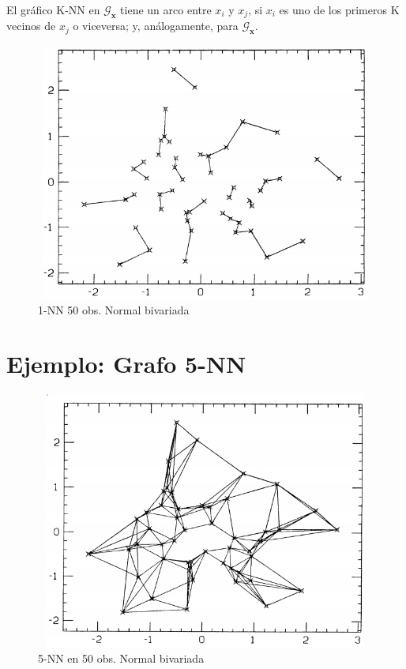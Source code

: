 \documentclass[]{book}
\begin{document}
El gráfico K-NN en \(\mathcal{G}_{\mathbf{x}}\) tiene un arco entre
\(x_i\) y \(x_j\), si \(x_i\) es uno de los primeros K vecinos de
\(x_j\) o viceversa; y, análogamente, para \(\mathcal{G}_{\mathbf{x}}\).

\begin{figure}

{\centering \includegraphics[width=450,height=320]{1-nn} 

}

\caption{1-NN 50 obs. Normal bivariada}\label{fig:unnamed-chunk-5}
\end{figure}

\section{Ejemplo: Grafo 5-NN}\label{ejemplo-grafo-5-nn}

\begin{figure}

{\centering \includegraphics[width=450,height=320]{5-nn} 

}

\caption{5-NN en 50 obs. Normal bivariada}\label{fig:unnamed-chunk-6}
\end{figure}
\end{document}

